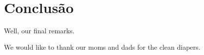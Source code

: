 \documentclass[sigconf]{acmart}
\begin{document}
\section{Conclusão}
\label{sec:conclusao}

Well, our final remarks.


\begin{acks}
We would like to thank our moms and dads for the clean diapers.
\end{acks}



\end{document}
